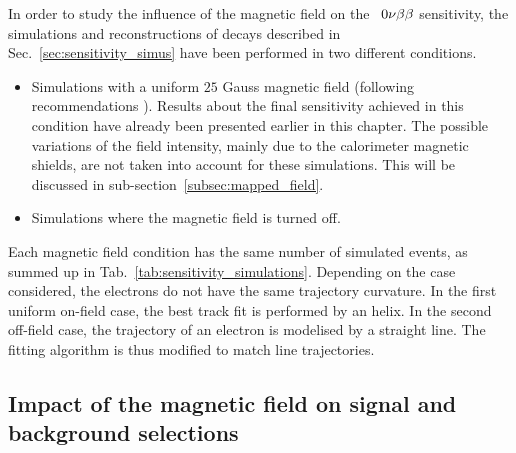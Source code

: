 In order to study the influence of the magnetic field on the \Se\ $0\nu\beta\beta$ sensitivity, the simulations and reconstructions of decays described in Sec.~\ref{sec:sensitivity_simus} have been performed in two different conditions.
\begin{itemize}
\item Simulations with a uniform $25$ Gauss magnetic field (following recommendations \cite{CalvezThesis}).
  Results about the final sensitivity achieved in this condition have already been presented earlier in this chapter.
  The possible variations of the field intensity, mainly due to the calorimeter magnetic shields, are not taken into account for these simulations.
  This will be discussed in sub-section~\ref{subsec:mapped_field}.
\item Simulations where the magnetic field is turned off.
\end{itemize}
Each magnetic field condition has the same number of simulated events, as summed up in Tab.~\ref{tab:sensitivity_simulations}.
Depending on the case considered, the electrons do not have the same trajectory curvature.
In the first uniform on-field case, the best track fit is performed by an helix.
In the second off-field case, the trajectory of an electron is modelised by a straight line.
The fitting algorithm is thus modified to match line trajectories.

\subsection{Impact of the magnetic field on signal and background selections}

